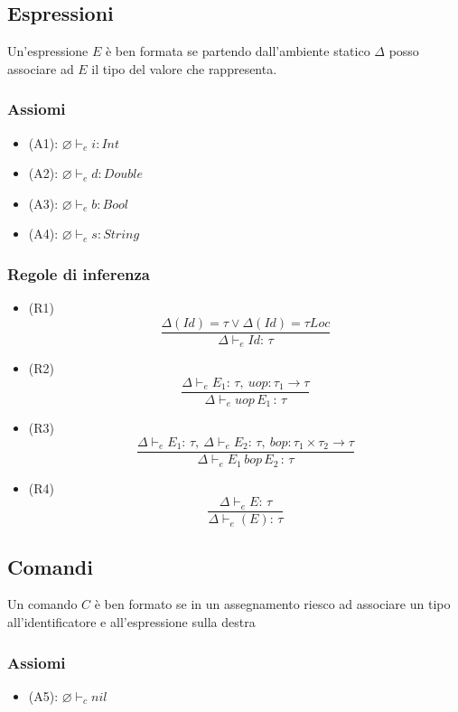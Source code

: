 \documentclass{article}
\begin{document}
\subsection*{Espressioni}
Un'espressione \(E\) è ben formata se partendo dall'ambiente statico \(\Delta\) posso associare ad \(E\) il tipo del valore che rappresenta.
\subsubsection*{Assiomi}
\begin{itemize}
  \item (A1): \(\varnothing \vdash_e i : Int\)
  \item (A2): \(\varnothing \vdash_e d : Double\)
  \item (A3): \(\varnothing \vdash_e b : Bool\)
  \item (A4): \(\varnothing \vdash_e s : String\)
\end{itemize}
\subsubsection*{Regole di inferenza}
\begin{itemize}
  \item (R1)
        \[\frac
          {\Delta(Id) = \tau \lor \Delta(Id) = \tau Loc}
          {\Delta \vdash_e Id:\, \tau}\]

  \item (R2)
        \[\frac
          {\Delta \vdash_e E_1:\, \tau,\ uop: \tau_1 \rightarrow \tau}
          {\Delta \vdash_e uop\,E_1 \,:\, \tau}\]

  \item (R3)
        \[\frac
          {\Delta \vdash_e E_1:\, \tau,\ \Delta \vdash_e E_2:\, \tau,\ bop: \tau_1 \times \tau_2 \rightarrow \tau}
          {\Delta \vdash_e E_1\,bop\,E_2 \,:\, \tau}\]

  \item (R4)
        \[\frac{\Delta \vdash_e E:\, \tau}{\Delta \vdash_e (E):\, \tau}\]
\end{itemize}
\subsection*{Comandi}
Un comando \(C\) è ben formato se in un assegnamento riesco ad associare un tipo all'identificatore e all'espressione sulla destra
\subsubsection*{Assiomi}
\begin{itemize}
  \item (A5): \(\varnothing \vdash_c nil\)
\end{itemize}
\end{document}
